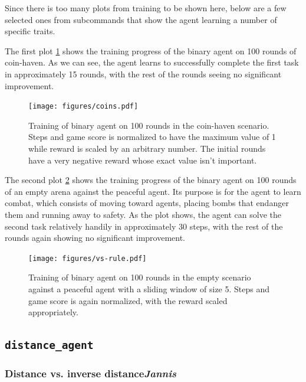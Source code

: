 \documentclass{article}
\begin{document}
Since there is too many plots from training to be shown here, below are a few selected ones from subcommands that show the agent learning a number of specific traits.

The first plot \ref{fig:coins} shows the training progress of the binary agent on 100 rounds of coin-haven.
As we can see, the agent learns to successfully complete the first task in approximately 15 rounds, with the rest of the rounds seeing no significant improvement.

\begin{figure}[h]
    \centering
    \texttt{[image: figures/coins.pdf]}
    \caption{Training of binary agent on 100 rounds in the coin-haven scenario. Steps and game score is normalized to have the maximum value of 1 while reward is scaled by an arbitrary number. The initial rounds have a very negative reward whose exact value isn't important.}
    \label{fig:coins}
\end{figure}

The second plot \ref{fig:vs-rule} shows the training progress of the binary agent on 100 rounds of an empty arena against the peaceful agent.
Its purpose is for the agent to learn combat, which consists of moving toward agents, placing bombs that endanger them and running away to safety.
As the plot shows, the agent can solve the second task relatively handily in approximately 30 steps, with the rest of the rounds again showing no significant improvement. 

\begin{figure}[h]
    \centering
    \texttt{[image: figures/vs-rule.pdf]}
    \caption{Training of binary agent on 100 rounds in the empty scenario against a peaceful agent with a sliding window of size 5. Steps and game score is again normalized, with the reward scaled appropriately.}
    \label{fig:vs-rule}
\end{figure}

\clearpage

\subsection[\texttt{distance\_agent}]{\texttt{distance\_agent}}

\subsubsection[Distance vs. inverse distance]{Distance vs. inverse distance{\normalsize \normalfont \it \hfill Jannis}}
\end{document}
